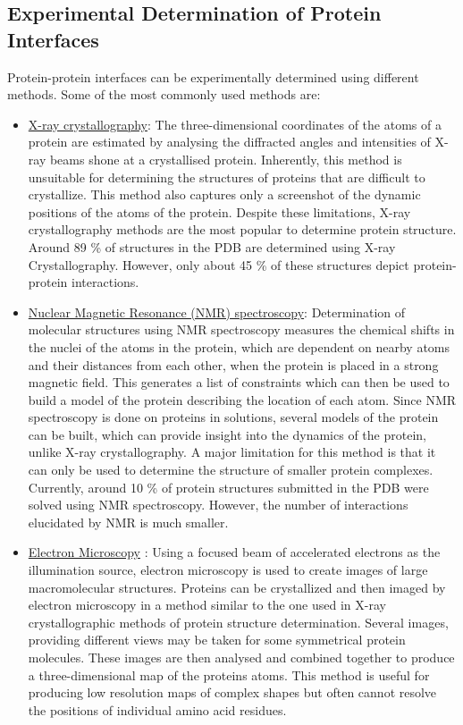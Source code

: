 \subsection{Experimental Determination of Protein Interfaces}
\par
Protein-protein interfaces can be experimentally determined using different methods. Some of the most commonly used methods are:
\begin{itemize}
\item \underline{X-ray crystallography}: The three-dimensional coordinates of the atoms of a protein are estimated by analysing the diffracted angles and intensities of X-ray beams shone at a crystallised protein. Inherently, this method is unsuitable for determining the structures of proteins that are difficult to crystallize. This method also captures only a screenshot of the dynamic positions of the atoms of the protein. Despite these limitations, X-ray crystallography methods are the most popular to determine protein structure. Around 89 \% of structures in the PDB are determined using X-ray Crystallography. However, only about 45 \% of these structures depict protein-protein interactions.
\item \underline{Nuclear Magnetic Resonance (NMR) spectroscopy}: Determination of molecular structures using NMR spectroscopy measures the chemical shifts in the nuclei of the atoms in the protein, which are dependent on nearby atoms and their distances from each other, when the protein is placed in a strong magnetic field. This generates a list of constraints which can then be used to build a model of the protein describing the location of each atom. Since NMR spectroscopy is done on proteins in solutions, several models of the protein can be built, which can provide insight into the dynamics of the protein, unlike X-ray crystallography. A major limitation for this method is that it can only be used to determine the structure of smaller protein complexes. Currently, around 10 \% of protein structures submitted in the PDB were solved using NMR spectroscopy. However, the number of interactions elucidated by NMR is much smaller.
\item \underline{Electron Microscopy} : Using a focused beam of accelerated electrons as the illumination source, electron microscopy is used to create images of large macromolecular structures. Proteins can be crystallized and then imaged by electron microscopy in a method similar to the one used in X-ray crystallographic methods of protein structure determination. Several images, providing different views may be taken for some symmetrical protein molecules. These images are then analysed and combined together to produce a three-dimensional map of the proteins atoms. This method is useful for producing low resolution maps of complex shapes but often cannot resolve the positions of individual amino acid residues.

\end{itemize}

